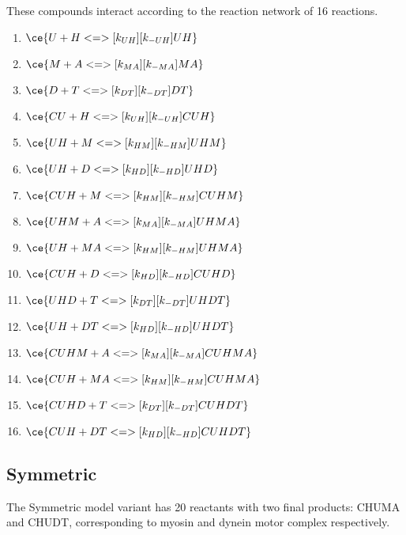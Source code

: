 These compounds interact according to the reaction network of 16 reactions. 

\begin{enumerate}
\item $\ce{U + H <=>[k_{UH}][k_{-UH}] UH}$ %
\item $\ce{M + A <=>[k_{MA}][k_{-MA}] MA}$ %
\item $\ce{D + T <=>[k_{DT}][k_{-DT}] DT}$ %

\item $\ce{CU + H <=>[k_{UH}][k_{-UH}] CUH}$ %
\item $\ce{UH + M <=>[k_{HM}][k_{-HM}] UHM}$ %
\item $\ce{UH + D <=>[k_{HD}][k_{-HD}] UHD}$ %

\item $\ce{CUH + M <=>[k_{HM}][k_{-HM}] CUHM}$ %
\item $\ce{UHM + A <=>[k_{MA}][k_{-MA}] UHMA}$ %
\item $\ce{UH + MA <=>[k_{HM}][k_{-HM}] UHMA}$ %
\item $\ce{CUH + D <=>[k_{HD}][k_{-HD}] CUHD}$ %
\item $\ce{UHD + T <=>[k_{DT}][k_{-DT}] UHDT}$ %
\item $\ce{UH + DT <=>[k_{HD}][k_{-HD}] UHDT}$ %

\item $\ce{CUHM + A <=>[k_{MA}][k_{-MA}] CUHMA}$ %
\item $\ce{CUH + MA <=>[k_{HM}][k_{-HM}] CUHMA}$ %
\item $\ce{CUHD + T <=>[k_{DT}][k_{-DT}] CUHDT}$ %
\item $\ce{CUH + DT <=>[k_{HD}][k_{-HD}] CUHDT}$ %
\end{enumerate}

\subsection{Symmetric}

The Symmetric model variant has 20 reactants with two final products: CHUMA and CHUDT, corresponding to myosin and dynein motor complex respectively.

